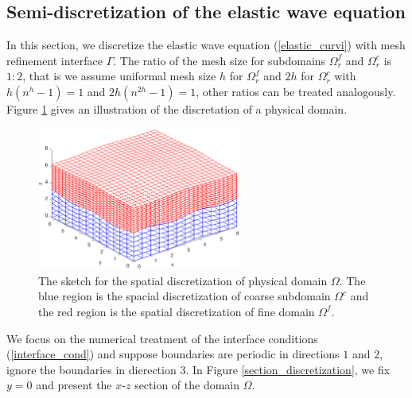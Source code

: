 \subsection{Semi-discretization of the elastic wave equation}\label{semi_discrete_form}

In this section, we discretize the elastic wave equation (\ref{elastic_curvi}) with mesh refinement interface $\Gamma$. The ratio of the mesh size for subdomains $\Omega^f_r$ and $\Omega^c_r$ is $1:2$, that is we assume uniformal mesh size $h$ for $\Omega^f_r$ and $2h$ for $\Omega^c_r$ with $h(n^h-1) = 1$ and $2h(n^{2h}-1) = 1$, other ratios can be treated analogously. Figure \ref{physical_discretization} gives an illustration of the discretation of a physical domain. 
\begin{figure}[htbp]
	\centering
	\includegraphics[width=0.6\textwidth,trim={0cm 1.1cm 1cm 2.3cm}, clip]{physical_discretization.eps}
	\caption{The sketch for the spatial discretization of physical domain $\Omega$. The blue region is the spacial discretization of coarse subdomain $\Omega^c$ and the red region is the spatial discretization of fine domain $\Omega^f$.}\label{physical_discretization}
\end{figure}
We focus on the numerical treatment of the interface conditions (\ref{interface_cond}) and suppose boundaries are periodic in directions $1$ and $2$, ignore the boundaries in dierection $3$. In Figure \ref{section_discretization}, we fix $y = 0$ and present the $x$-$z$ section of the domain $\Omega$.
